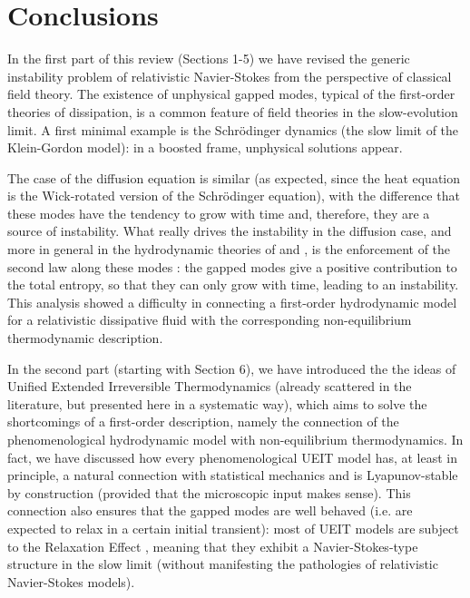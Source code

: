 \documentclass[a4paper, amsfonts, amssymb, amsmath, reprint, twocolumn, showkeys, nofootinbib]{revtex4-2}
\begin{document}
\section{Conclusions}

In the first part of this review (Sections 1-5) we have revised the generic instability problem of relativistic Navier-Stokes \citep{Hiscock_Insatibility_first_order} from the perspective of classical field theory. The existence of unphysical gapped modes, typical of the first-order theories of dissipation, is a common feature of field theories in the slow-evolution limit. A first minimal example is the Schr\"{o}dinger dynamics (the slow limit of the Klein-Gordon model): in a boosted frame, unphysical solutions appear. 

The case of the diffusion equation is similar (as expected, since the heat equation is the Wick-rotated version of the Schr\"{o}dinger equation), with the difference that these modes have the tendency to grow with time and, therefore, they are a source of instability. 
What really drives the instability in the diffusion case, and more in general in the hydrodynamic theories of \citet{Eckart40} and \citet{landau6}, is the enforcement of the second law along these modes \citep{GavassinoLyapunov_2020}: the gapped modes give a positive contribution to the total entropy, so that they can only grow with time, leading to an instability. 
This analysis showed a difficulty in connecting a first-order hydrodynamic model for a relativistic dissipative fluid with the corresponding non-equilibrium thermodynamic description.

In the second part (starting with Section 6), we have introduced the the ideas of Unified Extended Irreversible Thermodynamics (already scattered in the literature, but presented here in a systematic way), which aims to solve the shortcomings of a first-order description, namely the connection of the phenomenological hydrodynamic model with non-equilibrium thermodynamics. 
In fact, we have discussed how every phenomenological UEIT model has, at least in principle, a natural connection with statistical mechanics and is Lyapunov-stable by construction (provided that the microscopic input makes sense). 
This connection also ensures that the gapped modes are well behaved (i.e. are expected to relax in a certain initial transient): most of UEIT models are subject to the Relaxation Effect \citep{LindblomRelaxation1996}, meaning that they exhibit a Navier-Stokes-type structure in the slow limit (without manifesting the pathologies of relativistic Navier-Stokes models).
\end{document}
